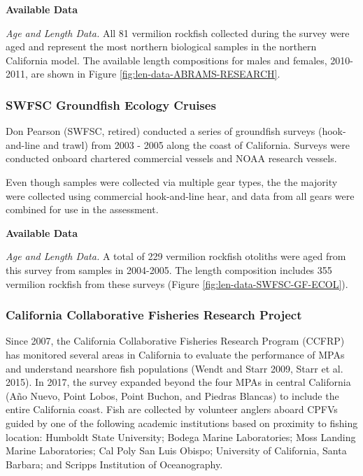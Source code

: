 \documentclass[11pt,
  english,
]{article}
\begin{document}
\textbf{Available Data}

\emph{Age and Length Data.} All 81 vermilion rockfish collected during the survey were aged and represent the most northern biological samples in the northern California model. The available length compositions for males and females, 2010-2011, are shown in Figure \ref{fig:len-data-ABRAMS-RESEARCH}.


\hypertarget{swfsc-groundfish-ecology-cruises}{%
\subsubsection{SWFSC Groundfish Ecology Cruises}\label{swfsc-groundfish-ecology-cruises}}

\leavevmode\tagmcend\tagstructend

Don Pearson (SWFSC, retired) conducted a series of groundfish surveys (hook-and-line and trawl) from 2003 - 2005 along the coast of California. Surveys were conducted onboard chartered commercial vessels and NOAA research vessels.

Even though samples were collected via multiple gear types, the the majority were collected using commercial hook-and-line hear, and data from all gears were combined for use in the assessment.

\textbf{Available Data}

\emph{Age and Length Data.} A total of 229 vermilion rockfish otoliths were aged from this survey from samples in 2004-2005. The length composition includes 355 vermilion rockfish from these surveys (Figure \ref{fig:len-data-SWFSC-GF-ECOL}).


\hypertarget{california-collaborative-fisheries-research-project}{%
\subsubsection{California Collaborative Fisheries Research Project}\label{california-collaborative-fisheries-research-project}}

\leavevmode\tagmcend\tagstructend

Since 2007, the California Collaborative Fisheries Research Program (CCFRP) has monitored several areas in California to evaluate the performance of MPAs and understand nearshore fish populations {(Wendt and Starr 2009, Starr et al. 2015)\leavevmode\tagmcend\tagstructend}. In 2017, the survey expanded beyond the four MPAs in central California (Año Nuevo, Point Lobos, Point Buchon, and Piedras Blancas) to include the entire California coast. Fish are collected by volunteer anglers aboard CPFVs guided by one of the following academic institutions based on proximity to fishing location: Humboldt State University; Bodega Marine Laboratories; Moss Landing Marine Laboratories; Cal Poly San Luis Obispo; University of California, Santa Barbara; and Scripps Institution of Oceanography.
\end{document}

